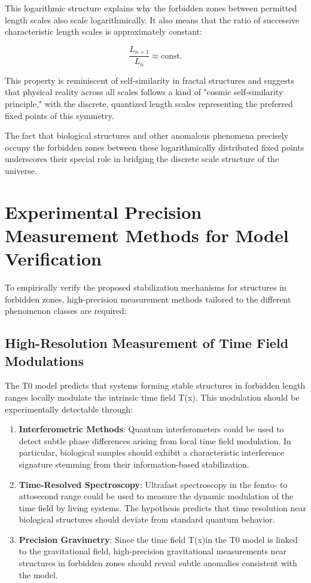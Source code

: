 \documentclass[12pt,a4paper]{article}
\newcommand{\Tfield}{T(x)}
\begin{document}
	This logarithmic structure explains why the forbidden zones between permitted length scales also scale logarithmically. It also means that the ratio of successive characteristic length scales is approximately constant:
	
	\begin{equation}
		\frac{L_{n+1}}{L_n} \approx \text{const.}
	\end{equation}
	
	This property is reminiscent of self-similarity in fractal structures and suggests that physical reality across all scales follows a kind of "cosmic self-similarity principle," with the discrete, quantized length scales representing the preferred fixed points of this symmetry.
	
	The fact that biological structures and other anomalous phenomena precisely occupy the forbidden zones between these logarithmically distributed fixed points underscores their special role in bridging the discrete scale structure of the universe.
	
	\section{Experimental Precision Measurement Methods for Model Verification}
	\label{sec:feinmessmethoden}
	
	To empirically verify the proposed stabilization mechanisms for structures in forbidden zones, high-precision measurement methods tailored to the different phenomenon classes are required:
	
	\subsection{High-Resolution Measurement of Time Field Modulations}
	\label{subsec:zeitfeld_modulationen}
	
	The T0 model predicts that systems forming stable structures in forbidden length ranges locally modulate the intrinsic time field \Tfield. This modulation should be experimentally detectable through:
	
	\begin{enumerate}
		\item \textbf{Interferometric Methods}: Quantum interferometers could be used to detect subtle phase differences arising from local time field modulation. In particular, biological samples should exhibit a characteristic interference signature stemming from their information-based stabilization.
		
		\item \textbf{Time-Resolved Spectroscopy}: Ultrafast spectroscopy in the femto- to attosecond range could be used to measure the dynamic modulation of the time field by living systems. The hypothesis predicts that time resolution near biological structures should deviate from standard quantum behavior.
		
		\item \textbf{Precision Gravimetry}: Since the time field \Tfield in the T0 model is linked to the gravitational field, high-precision gravitational measurements near structures in forbidden zones should reveal subtle anomalies consistent with the model.
	\end{enumerate}
	
\end{document}
